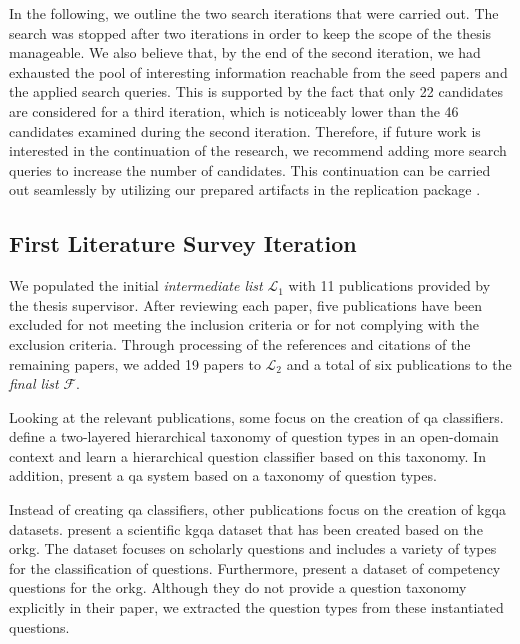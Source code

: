 In the following, we outline the two search iterations that were carried out. The search was stopped after two iterations in order to keep the scope of the thesis manageable. We also believe that, by the end of the second iteration, we had exhausted the pool of interesting information reachable from the seed papers and the applied search queries. This is supported by the fact that only 22 candidates are considered for a third iteration, which is noticeably lower than the 46 candidates examined during the second iteration. Therefore, if future work is interested in the continuation of the research, we recommend adding more search queries to increase the number of candidates. This continuation can be carried out seamlessly by utilizing our prepared artifacts in the replication package \cite{schneider_replication_2025}.

\subsection{First Literature Survey Iteration}

We populated the initial \emph{intermediate list} $\mathcal{L}_1$ with 11 publications provided by the thesis supervisor. After reviewing each paper, five publications have been excluded for not meeting the inclusion criteria or for not complying with the exclusion criteria. Through processing of the references and citations of the remaining papers, we added 19 papers to $\mathcal{L}_2$ and a total of six publications to the \emph{final list} $\mathcal{F}$. 

Looking at the relevant publications, some focus on the creation of \gls{qa} classifiers. \textcite{li_learning_2002} define a two-layered hierarchical taxonomy of question types in an open-domain context and learn a hierarchical question classifier based on this taxonomy. In addition, \textcite{singhal_att_1999} present a \gls{qa} system based on a taxonomy of question types. 

Instead of creating \gls{qa} classifiers, other publications focus on the creation of \gls{kgqa} datasets. \textcite{auer_sciqa_2023} present a scientific \gls{kgqa} dataset that has been created based on the \gls{orkg}. The dataset focuses on scholarly questions and includes a variety of types for the classification of questions. Furthermore, \textcite{karras_divide_2023} present a dataset of competency questions for the \gls{orkg}. Although they do not provide a question taxonomy explicitly in their paper, we extracted the question types from these instantiated questions.

